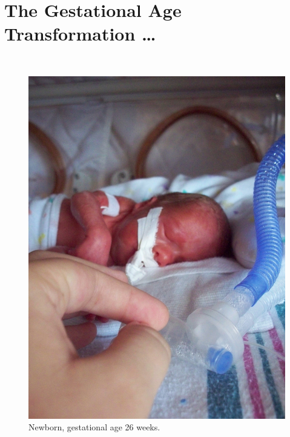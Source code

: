\documentclass{beamer}
\begin{document}
\section{The Gestational Age Transformation \ldots} %

\begin{frame}
\frametitle{\insertsection}

\begin{columns}[c]


\begin{figure}[htb!]
\includegraphics[]{./fig/premature_newborn.jpg} \\
Newborn, gestational age 26 weeks.
\end{figure}


\end{columns}
\end{frame}
\end{document}
